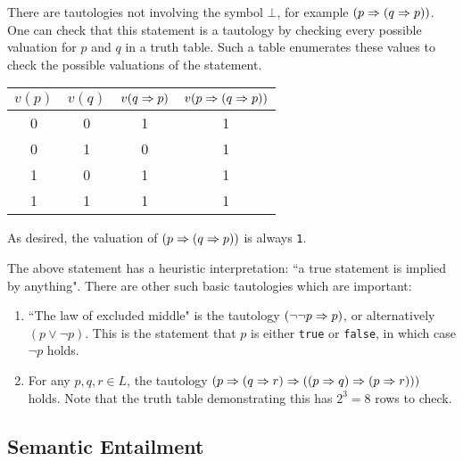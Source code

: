 \documentclass{article}
\begin{document}
\begin{note}
	There are tautologies not involving the symbol $\bot$, for example $(p \Rightarrow (q \Rightarrow p))$. One can check that this statement is a tautology by checking every possible valuation for $p$ and $q$ in a truth table. Such a table enumerates these values to check the possible valuations of the statement.
\end{note}

\renewcommand{\arraystretch}{1.3}

\begin{table}[h!]
\small{
\begin{center}

\begin{tabular}{|c|c|c|c|}
\hline
$v(p)$ & $v(q)$ & $v(q \Rightarrow p)$ & $v(p \Rightarrow (q \Rightarrow p))$ \\ \hline
0 & 0 & 1 & 1 \\ \hline
0 & 1 & 0 & 1 \\ \hline
1 & 0 & 1 & 1 \\ \hline
1 & 1 & 1 & 1 \\ \hline
\end{tabular}
\end{center}
}
\end{table}
As desired, the valuation of $(p \Rightarrow (q \Rightarrow p))$ is always \texttt{1}.

\begin{example}
    The above statement has a heuristic interpretation: ``a true statement is implied by anything". There are other such basic tautologies which are important:
    \begin{enumerate}
    	\item ``The law of excluded middle" is the tautology $(\lnot \lnot p \Rightarrow p)$, or alternatively $(p \lor \lnot p)$. This is the statement that $p$ is either \texttt{true} or \texttt{false}, in which case $\lnot p$ holds.
    	\item For any $p, q, r \in L$, the tautology $(p \Rightarrow (q \Rightarrow r) \Rightarrow ((p \Rightarrow q) \Rightarrow (p \Rightarrow r)))$ holds. Note that the truth table demonstrating this has $2^3 = 8$ rows to check.
	\end{enumerate}
\end{example}


\subsection{Semantic Entailment}
\end{document}
